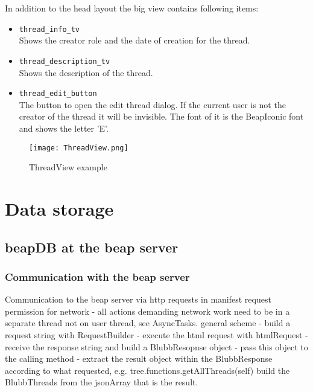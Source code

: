 \documentclass[12pt,a4paper,oneside]{report}
\newcommand{\code}[1]{\lstinline{#1}}
\begin{document}
In addition to the head layout the big view contains following items:
\begin{itemize}
\item \code{thread_info_tv}\\
Shows the creator role and the date of creation for the thread.

\item \code{thread_description_tv}\\
Shows the description of the thread.

\item \code{thread_edit_button}\\
The button to open the edit thread dialog. If the current user is not the creator of the thread it will be invisible. The font of it is the BeapIconic font and shows the letter 'E'.

\end{itemize}

\begin{figure}[!ht]
	\centering
    \texttt{[image: ThreadView.png]}
	\caption{ThreadView example}
\end{figure}

\section{Data storage}

\subsection{beapDB at the beap server}

\subsubsection{Communication with the beap server}
Communication to the beap server via http requests 
in manifest request permission for network - all actions demanding network work need to be in a separate thread not on user thread, see AsyncTasks.
general scheme
	- build a request string with RequestBuilder
	- execute the html request with htmlRequest
	- receive the response string and build a BlubbResopnse object
	- pass this object to the calling method
	- extract the result object within the BlubbResponse according to what requested, e.g. tree.functions.getAllThreads(self) build the BlubbThreads from the jsonArray that is the result.
	
\end{document}
